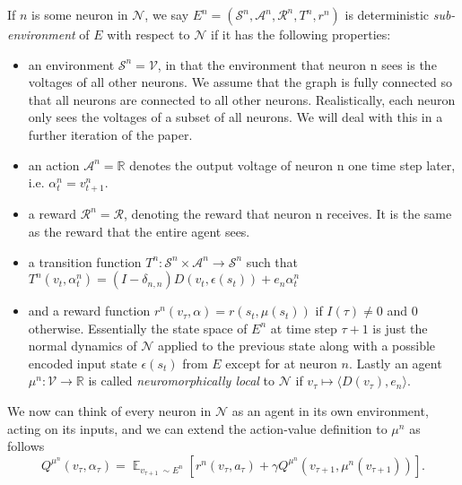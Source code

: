 \documentclass{article} %
\numberwithin{equation}{subsection}
\numberwithin{theorem}{subsection}
\def\reals{{\mathbb R}}
\def\expect{\mathop{{\mathbb{E}}}}
\def\scriptv{{\mathcal V}}
\def\scripta{{\mathcal A}}
\def\scriptr{{\mathcal R}}
\def\scriptn{{\mathcal N}}
\def\scripts{{\mathcal S}}
\begin{document}
 If $n$ is some neuron in $\scriptn$, we say $E^n = (\scripts^n, \scripta^n, \scriptr^n, T^n, r^n)$ is deterministic \emph{sub-environment} of $E$ with respect to $\scriptn$ if it has the following properties:

\begin{itemize}
  \item an environment $\scripts ^n = \scriptv$, in that the environment that neuron n sees is the voltages of all other neurons. We assume that the graph is fully connected so that all neurons are connected to all other neurons. Realistically, each neuron only sees the voltages of a subset of all neurons. We will deal with this in a further iteration of the paper.
  \item an action $\scripta ^n = \reals$ denotes the output voltage of neuron n one time step later, i.e. $\alpha_t^n = v_{t+1}^n$.
  \item a reward $\scriptr ^n = \scriptr$, denoting the reward that neuron n receives. It is the same as the reward that the entire agent sees.
  \item a transition function $T^n : \scripts ^n \times \scripta ^n \to \scripts ^n$ such that $T^n(v_t, \alpha_t^n) = (I - \delta_{n,n}) D(v_t, \epsilon(s_t)) + e_n \alpha_t^n$
  \item and a reward function $r^n(v_{\tau}, \alpha) = r(s_t, \mu(s_t))$ if $I(\tau) \neq 0$ and $0$ otherwise. Essentially the state space of $E^n$ at time step $\tau +1$ is just the normal dynamics of $\scriptn$ applied to the previous state along with a possible encoded input state $\epsilon(s_t)$ from $E$ except for at neuron $n$. Lastly an agent  $\mu^n: \scriptv \to \mathbb{R}$  is called \emph{neuromorphically local} to $\scriptn$ if $v_\tau \mapsto \langle D(v_\tau), e_n \rangle$.
\end{itemize}
We now can think of every neuron in $\scriptn$ as an agent in its own environment, acting on its inputs, and we can extend the action-value definition to $\mu^n$ as follows
\begin{equation}
    Q^{\mu^n}(v_\tau, \alpha_\tau) = \expect_{v_{\tau+1}\ \sim E^n}\left[r^n(v_\tau, a_\tau) + \gamma Q^{\mu^n}(v_{\tau+1}, \mu^n(v_{\tau+1}))\right].
\end{equation}
\end{document}
